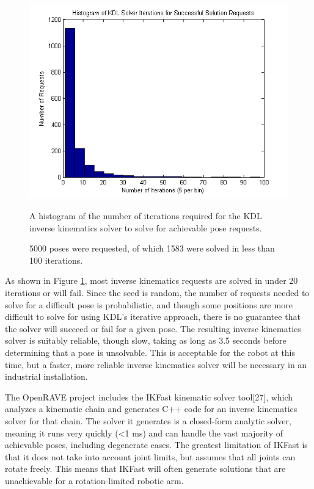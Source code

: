 \documentclass[]{cwru} %
\begin{document}
\begin{figure}[h]
\centering
\includegraphics[width=6.0in]{KDL_histogram}
\caption{A histogram of the number of iterations required for the KDL inverse 
kinematics solver to solve for achievable pose requests.}
\caption*{5000 poses were requested, of which 1583 were solved in less than 
100 iterations.}
\label{fig:kdl-histo}
\end{figure}

As shown in Figure \ref{fig:kdl-histo}, most inverse kinematics requests are solved in
under 20 iterations or will fail. Since the seed is random, the number
of requests needed to solve for a difficult pose is probabilistic, and
though some positions are more difficult to solve for using KDL's
iterative approach, there is no guarantee that the solver will succeed
or fail for a given pose. The resulting inverse kinematics solver is
suitably reliable, though slow, taking as long as 3.5 seconds before
determining that a pose is unsolvable. This is acceptable for the robot
at this time, but a faster, more reliable inverse kinematics solver will
be necessary in an industrial installation.

The OpenRAVE project includes the IKFast kinematic solver tool{[}27{]},
which analyzes a kinematic chain and generates C++ code for an inverse
kinematics solver for that chain. The solver it generates is a
closed-form analytic solver, meaning it runs very quickly (\textless{}1
ms) and can handle the vast majority of achievable poses, including
degenerate cases. The greatest limitation of IKFast is that it does not
take into account joint limits, but assumes that all joints can rotate
freely. This means that IKFast will often generate solutions that are
unachievable for a rotation-limited robotic arm.
\end{document}
